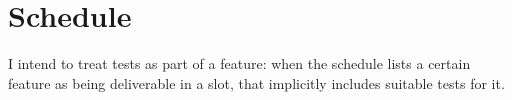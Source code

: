\documentclass[12pt]{article}
\begin{document}
\section*{Schedule}

I intend to treat tests as part of a feature: when the schedule lists a certain feature as being deliverable in a slot,
that implicitly includes suitable tests for it.


\makeatletter
\renewcommand\AdvanceDate[1][\@ne]{\global\advance\day#1 \FixDate}
\renewcommand\FixDate{%
  \FixMonth \is@LeapYear
  \l@@p \global\ifnum\day<1 \Pr@vD@y \repeat
  \l@@p \M@s\m@sic \global\ifnum\day>\M@s \N@xtD@y \repeat
}
\renewcommand\FixMonth{%
  \L@@p \global\ifnum\month<1 \global\advance\year\m@ne \global\advance\month12 \is@LeapYear \repeat
  \L@@p \global\ifnum\month>12 \global\advance\year\@ne \global\advance\month-12 \is@LeapYear \repeat}
\def\Pr@vD@y{%
  \global\ifnum\day<-366
    \global\ifnum\month>2
      \global\advance\day\r@k \global\advance\year\m@ne \is@LeapYear
    \else
      \global\advance\year\m@ne \is@LeapYear \advance\day\r@k
    \fi
  \else
    \global\advance\month\m@ne \FixMonth
    \global\advance\day\m@sic
  \fi}
\def\N@xtD@y{%
  \global\ifnum\day>366
    \global\ifnum\month>2
      \global\advance\year\@ne \is@LeapYear \global\advance\day-\r@k
    \else
      \global\advance\day-\r@k \global\advance\year\@ne \is@LeapYear
    \fi
  \else
    \global\advance\day-\M@s \global\advance\month\@ne \FixMonth
  \fi}
\makeatother

\newcommand{\daterange}[1]{%
    \textbf{\datefmt\today}
    \textbf{--}
    \AdvanceDate[#1]\relax
    \textbf{\datefmt\today}
    \AdvanceDate[1]\relax
}
\end{document}
